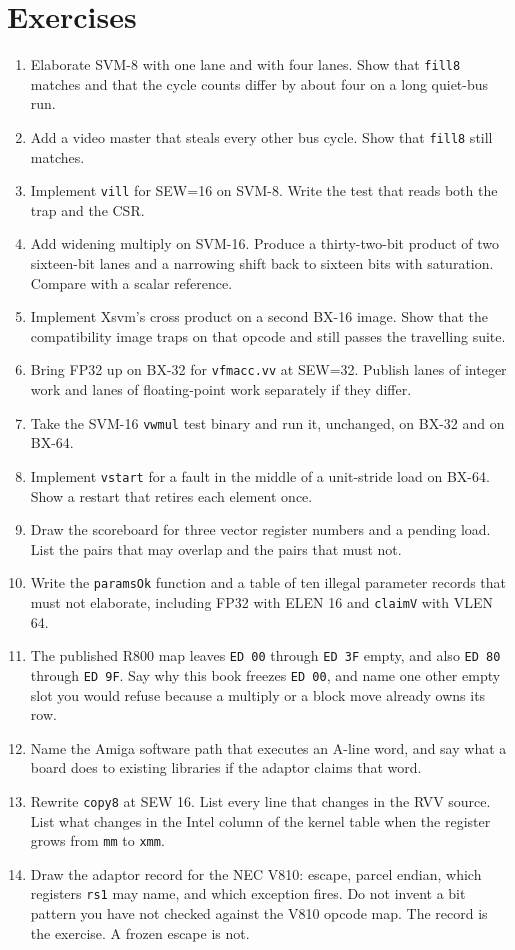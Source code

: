 \chapter{Exercises}

\begin{enumerate}[leftmargin=1.5em]
  \item Elaborate SVM-8 with one lane and with four lanes. Show that \texttt{fill8} matches and that the cycle counts differ by about four on a long quiet-bus run.
  \item Add a video master that steals every other bus cycle. Show that \texttt{fill8} still matches.
  \item Implement \texttt{vill} for SEW=16 on SVM-8. Write the test that reads both the trap and the CSR.
  \item Add widening multiply on SVM-16. Produce a thirty-two-bit product of two sixteen-bit lanes and a narrowing shift back to sixteen bits with saturation. Compare with a scalar reference.
  \item Implement Xsvm's cross product on a second BX-16 image. Show that the compatibility image traps on that opcode and still passes the travelling suite.
  \item Bring FP32 up on BX-32 for \texttt{vfmacc.vv} at SEW=32. Publish lanes of integer work and lanes of floating-point work separately if they differ.
  \item Take the SVM-16 \texttt{vwmul} test binary and run it, unchanged, on BX-32 and on BX-64.
  \item Implement \texttt{vstart} for a fault in the middle of a unit-stride load on BX-64. Show a restart that retires each element once.
  \item Draw the scoreboard for three vector register numbers and a pending load. List the pairs that may overlap and the pairs that must not.
  \item Write the \texttt{paramsOk} function and a table of ten illegal parameter records that must not elaborate, including FP32 with ELEN 16 and \texttt{claimV} with VLEN 64.
  \item The published R800 map leaves \texttt{ED 00} through \texttt{ED 3F} empty, and also \texttt{ED 80} through \texttt{ED 9F}. Say why this book freezes \texttt{ED 00}, and name one other empty slot you would refuse because a multiply or a block move already owns its row.
  \item Name the Amiga software path that executes an A-line word, and say what a board does to existing libraries if the adaptor claims that word.
  \item Rewrite \texttt{copy8} at SEW 16. List every line that changes in the RVV source. List what changes in the Intel column of the kernel table when the register grows from \texttt{mm} to \texttt{xmm}.
  \item Draw the adaptor record for the NEC V810: escape, parcel endian, which registers \texttt{rs1} may name, and which exception fires. Do not invent a bit pattern you have not checked against the V810 opcode map. The record is the exercise. A frozen escape is not.
\end{enumerate}
